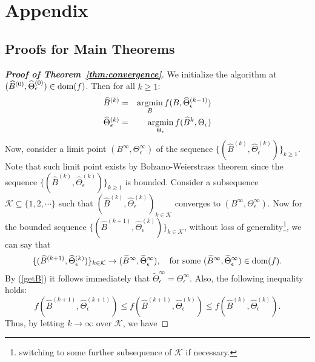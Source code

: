 \section{Appendix}
\subsection{Proofs for Main Theorems}\label{sec:proof-theorems}
\begin{proof}[\textbf{Proof of Theorem~\ref{thm:convergence}}]
	We initialize the algorithm at $(\widehat{B}^{(0)},\widehat{\Theta}^{(0)}_\epsilon)\in\mbox{dom}(f)$. Then for all $k\geq 1$:
	\begin{eqnarray}
	\widehat{B}^{(k)} &=& \mathop{\text{argmin}}\limits_{B} f(B,\widehat{\Theta}_\epsilon^{(k-1)}) \label{getB}\\
	\widehat{\Theta}^{(k)}_\epsilon & = & \mathop{\text{argmin}}\limits_{\Theta_\epsilon} f(\widehat{B}^k,\Theta_\epsilon)\label{getTheta}
	\end{eqnarray} 
	Now, consider a limit point $(B^\infty,\Theta_\epsilon^\infty)$ of the sequence $\{(\widehat{B}^{(k)},\widehat{\Theta}_\epsilon^{(k)})\}_{k\geq 1}$. Note that such limit point exists by Bolzano-Weierstrass theorem since the sequence $\{(\widehat{B}^{(k)},\widehat{\Theta}_\epsilon^{(k)})\}_{k\geq 1}$ is bounded. Consider a subsequence $\mathcal{K}\subseteq\{1,2,\cdots\}$ such that $(\widehat{B}^{(k)},\widehat{\Theta}_\epsilon^{(k)})_{k\in \mathcal{K}}$ converges to $(B^\infty,\Theta_\epsilon^{\infty})$. Now for the bounded sequence $\{(\widehat{B}^{(k+1)},\widehat{\Theta}_\epsilon^{(k)})\}_{k\in\mathcal{K}}$, without loss of generality\footnote{switching to some further subsequence of $\mathcal{K}$ if necessary.}, we can say that 
	\begin{equation*}
	\{(\widehat{B}^{(k+1)},\widehat{\Theta}_\epsilon^{(k)})\}_{k\in\mathcal{K}}\rightarrow (\widetilde{B}^\infty,\widetilde{\Theta}_\epsilon^\infty), \quad \text{for some }(\widetilde{B}^\infty,\widetilde{\Theta}_\epsilon^\infty)\in\mbox{dom}(f).
	\end{equation*}
	By (\ref{getB}) it follows immediately that $\widetilde{\Theta}_\epsilon^\infty = \Theta^\infty_\epsilon$. Also, the following inequality holds: 
	\begin{equation*}
	f(\widehat{B}^{(k+1)},\widehat{\Theta}_\epsilon^{(k+1)})\leq f(\widehat{B}^{(k+1)},\widehat{\Theta}_\epsilon^{(k)})\leq f(\widehat{B}^{(k)},\widehat{\Theta}_\epsilon^{(k)}).
	\end{equation*}
	Thus, by letting $k\rightarrow\infty$ over $\mathcal{K}$, we have 

\end{proof}

